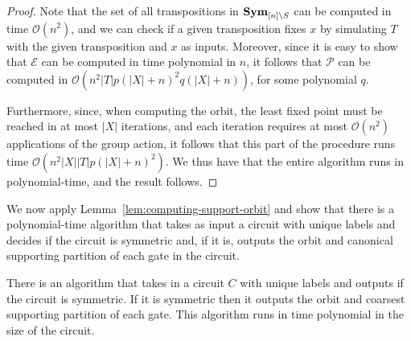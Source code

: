 \documentclass[../paper.tex]{subfiles}
\begin{document}
\begin{proof}
  Note that the set of all transpositions in $\text{\textbf{Sym}}_{[n] \setminus S}$ can be
  computed in time $\mathcal{O}(n^{2})$, and we can check if a given
  transposition fixes $x$ by simulating $T$ with the given transposition and $x$
  as inputs. Moreover, since it is easy to show that $\mathcal{E}$ can be
  computed in time polynomial in $n$, it follows that $\mathcal{P}$ can be
  computed in $\mathcal{O} (n^2 \vert T \vert p(\vert X \vert +n)^2 q(\vert X
  \vert + n))$, for some polynomial $q$.

  Furthermore, since, when computing the orbit, the least fixed point must be
  reached in at most $\vert X \vert$ iterations, and each iteration requires at
  most $\mathcal{O} (n^{2})$ applications of the group action, it follows that
  this part of the procedure runs time $\mathcal{O}(n^2\vert X \vert \vert T
  \vert p (\vert X \vert + n)^2)$. We thus have that the entire algorithm runs
  in polynomial-time, and the result follows.
\end{proof}

We now apply Lemma~\ref{lem:computing-support-orbit} and show that there is a
polynomial-time algorithm that takes as input a circuit with unique labels and
decides if the circuit is symmetric and, if it is, outputs the orbit and
canonical supporting partition of each gate in the circuit.

\begin{lem}
  There is an algorithm that takes in a circuit $C$ with unique labels and
  outputs if the circuit is symmetric. If it is symmetric then it outputs the
  orbit and coarsest supporting partition of each gate. This algorithm runs in
  time polynomial in the size of the circuit.
  \label{lem:computing-support-orbit-gate}
\end{lem}
\end{document}
